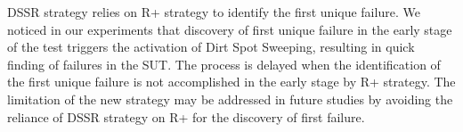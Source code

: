 \documentclass[conference]{IEEEtran}
\begin{document}

\noindent DSSR strategy relies on R+ strategy to identify the first unique failure. We noticed in our experiments that discovery of first unique failure in the early stage of the test triggers the activation of Dirt Spot Sweeping, resulting in quick finding of failures in the SUT. The process is delayed when the identification of the first unique failure is not accomplished in the early stage by R+ strategy. The limitation of the new strategy may be addressed in future studies by avoiding the reliance of DSSR strategy on R+ for the discovery of first failure.





\end{document}
